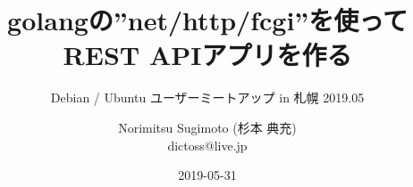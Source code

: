 




\documentclass[cjk,dvipdfmx,12pt]{beamer}
\usepackage{monthlypresentation}



\title{golangの''net/http/fcgi''を使ってREST APIアプリを作る}
\subtitle{Debian / Ubuntu ユーザーミートアップ in 札幌 2019.05}
\author{Norimitsu Sugimoto (杉本 典充) \\dictoss@live.jp}
\date{2019-05-31}



